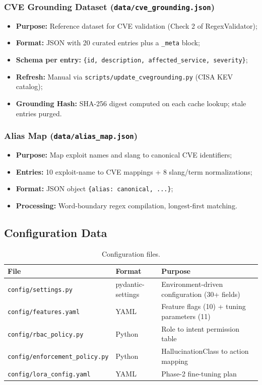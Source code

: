 \documentclass[10pt,journal,onecolumn]{IEEEtran}
\begin{document}
\subsubsection{CVE Grounding Dataset (\texttt{data/cve\_grounding.json})}
\begin{itemize}
\item \textbf{Purpose:} Reference dataset for CVE validation (Check 2 of RegexValidator);
\item \textbf{Format:} JSON with 20 curated entries plus a \texttt{\_meta} block;
\item \textbf{Schema per entry:} \texttt{\{id, description, affected\_service, severity\}};
\item \textbf{Refresh:} Manual via \texttt{scripts/update\_cve\allowbreak{}grounding.py} (CISA KEV catalog);
\item \textbf{Grounding Hash:} SHA-256 digest computed on each cache lookup; stale entries purged.
\end{itemize}

\subsubsection{Alias Map (\texttt{data/alias\_map.json})}
\begin{itemize}
\item \textbf{Purpose:} Map exploit names and slang to canonical CVE identifiers;
\item \textbf{Entries:} 10 exploit-name to CVE mappings + 8 slang/term normalizations;
\item \textbf{Format:} JSON object \texttt{\{alias: canonical, ...\}};
\item \textbf{Processing:} Word-boundary regex compilation, longest-first matching.
\end{itemize}

\subsection{Configuration Data}
\begin{table}[t]
\caption{Configuration files.}
\label{tab:config}
\begin{tabularx}{\textwidth}{>{\ttfamily}l l X}
\toprule
\textbf{File} & \textbf{Format} & \textbf{Purpose}\\
\midrule
\texttt{config/settings.py} & pydantic-settings & Environment-driven configuration (30+ fields)\\
\texttt{config/features.yaml} & YAML & Feature flags (10) + tuning parameters (11)\\
\texttt{config/rbac\_policy.py} & Python & Role to intent permission table\\
\texttt{config/enforcement\_policy.py} & Python & HallucinationClass to action mapping\\
\texttt{config/lora\_config.yaml} & YAML & Phase-2 fine-tuning plan\\
\bottomrule
\end{tabularx}
\end{table}
\end{document}
